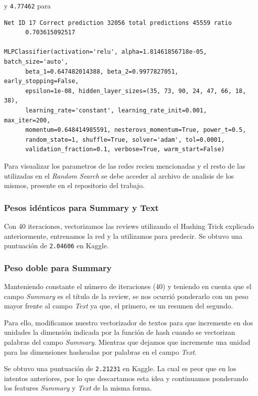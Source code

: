 \documentclass[10pt,a4paper]{article}
\begin{document}
y \texttt{4.77462} para

\begin{lstlisting}
Net ID 17 Correct prediction 32056 total predictions 45559 ratio        
      0.703615092517

MLPClassifier(activation='relu', alpha=1.81461856718e-05, batch_size='auto',
      beta_1=0.647482014388, beta_2=0.9977827051, early_stopping=False,
      epsilon=1e-08, hidden_layer_sizes=(35, 73, 90, 24, 47, 66, 18, 38),
      learning_rate='constant', learning_rate_init=0.001, max_iter=200,
      momentum=0.648414985591, nesterovs_momentum=True, power_t=0.5,
      random_state=1, shuffle=True, solver='adam', tol=0.0001,
      validation_fraction=0.1, verbose=True, warm_start=False)
\end{lstlisting}

Para visualizar los parametros de las redes recien mencionadas y el resto de las utilizadas en el \textit{Random Search} se debe acceder al archivo de analisis de los mismos, presente en el repositorio del trabajo.\cite{random_search}
\subsubsection{Pesos idénticos para Summary y Text}
Con 40 iteraciones, vectorizamos las reviews utilizando el Hashing Trick explicado anteriormente, entrenamos la red y la utilizamos para predecir. Se obtuvo una puntuación de \texttt{2.04606} en Kaggle.

\subsubsection{Peso doble para Summary}
Manteniendo constante el número de iteraciones (40) y teniendo en cuenta que el campo \textit{Summary} es el título de la review, se nos ocurrió ponderarlo con un peso mayor frente al campo \textit{Text} ya que, el primero, es un resumen del segundo.

Para ello, modificamos nuestro vectorizador de textos para que incremente en dos unidades la dimensión indicada por la función de hash cuando se vectorizan palabras del campo \textit{Summary}. Mientras que dejamos que incremente una unidad para las dimensiones hasheadas por palabras en el campo \textit{Text}.

Se obtuvo una puntuación de \texttt{2.21231} en Kaggle. La cual es peor que en los intentos anteriores, por lo que descartamos esta idea y continuamos ponderando los features \textit{Summary} y \textit{Text} de la misma forma.
\end{document}
